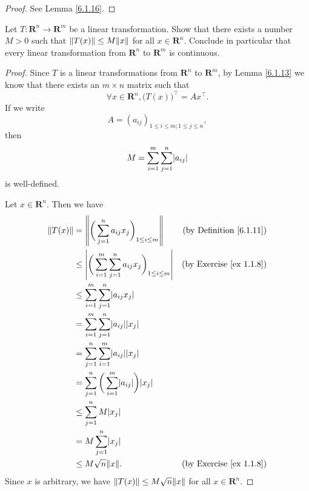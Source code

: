 \begin{proof}
    See Lemma \ref{6.1.16}.
\end{proof}

\begin{exercise}\label{ex 6.1.4}
    Let \(T : \mathbf{R}^n \to \mathbf{R}^m\) be a linear transformation.
    Show that there exists a number \(M > 0\) such that \(\norm*{T(x)} \leq M \norm*{x}\) for all \(x \in \mathbf{R}^n\).
    Conclude in particular that every linear transformation from \(\mathbf{R}^n\) to \(\mathbf{R}^m\) is continuous.
\end{exercise}

\begin{proof}
    Since \(T\) is a linear transformations from \(\mathbf{R}^n\) to \(\mathbf{R}^m\), by Lemma \ref{6.1.13} we know that there exists an \(m \times n\) matrix such that
    \[
        \forall x \in \mathbf{R}^n, \big(T(x)\big)^\top = Ax^\top.
    \]
    If we write
    \[
        A = (a_{ij})_{1 \leq i \leq m ; 1 \leq j \leq n},
    \]
    then
    \[
        M = \sum_{i = 1}^m \sum_{j = 1}^n \abs*{a_{ij}}
    \]
    is well-defined.

    Let \(x \in \mathbf{R}^n\).
    Then we have
    \begin{align*}
        \norm*{T(x)} & = \norm*{\bigg(\sum_{j = 1}^n a_{ij} x_j\bigg)_{1 \leq i \leq m}}                  & \text{(by Definition \ref{6.1.11})} \\
                     & \leq \abs*{\bigg(\sum_{i = 1}^m \sum_{j = 1}^n a_{ij} x_j\bigg)_{1 \leq i \leq m}} & \text{(by Exercise \ref{ex 1.1.8})} \\
                     & \leq \sum_{i = 1}^m \sum_{j = 1}^n \abs*{a_{ij} x_j}                                                                     \\
                     & = \sum_{i = 1}^m \sum_{j = 1}^n \abs*{a_{ij}} \abs*{x_j}                                                                 \\
                     & = \sum_{j = 1}^n \sum_{i = 1}^m \abs*{a_{ij}} \abs*{x_j}                                                                 \\
                     & = \sum_{j = 1}^n \bigg(\sum_{i = 1}^m \abs*{a_{ij}}\bigg) \abs*{x_j}                                                     \\
                     & \leq \sum_{j = 1}^n M \abs*{x_j}                                                                                         \\
                     & = M \sum_{j = 1}^n \abs*{x_j}                                                                                            \\
                     & \leq M \sqrt{n} \norm*{x}.                                                         & \text{(by Exercise \ref{ex 1.1.8})}
    \end{align*}
    Since \(x\) is arbitrary, we have \(\norm*{T(x)} \leq M \sqrt{n} \norm*{x}\) for all \(x \in \mathbf{R}^n\).


\end{proof}
